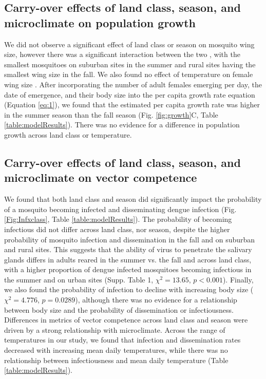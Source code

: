 \documentclass[12pt]{article}
\begin{document}
\subsection{Carry-over effects of land class, season, and microclimate on population growth}

We did not observe a significant effect of land class or season on mosquito wing size, however there was a significant interaction between the two , with the smallest mosquitoes on suburban sites in the summer and rural sites having the smallest wing size in the fall. We also found no effect of temperature on female wing size . After incorporating the number of adult females emerging per day, the date of emergence, and their body size into the per capita growth rate equation (Equation \ref{eq:1}), we found that the estimated per capita growth rate was higher in the summer season than the fall season (Fig. \ref{fig:growth}C, Table \ref{table:modelResults}). There was no evidence for a difference in population growth across land class or temperature.

\subsection{Carry-over effects of land class, season, and microclimate on vector competence}

We found that both land class and season did significantly impact the probability of a mosquito becoming infected and disseminating dengue infection (Fig. \ref{Fig:Infxclass}, Table \ref{table:modelResults}). The probability of becoming infectious did not differ across land class, nor season, despite the higher probability of mosquito infection and dissemination in the fall and on suburban and rural sites. This suggests that the ability of virus to penetrate the salivary glands differs in adults reared in the summer vs. the fall and across land class, with a higher proportion of dengue infected mosquitoes becoming infectious in the summer and on urban sites (Supp. Table 1, $\chi^2=13.65$, $p<0.001$). Finally, we also found the probability of infection to decline with increasing body size ($\chi^2=4.776$, $p=0.0289$), although there was no evidence for a relationship between body size and the probability of dissemination or infectiousness. Differences in metrics of vector competence across land class and season were driven by a strong relationship with microclimate. Across the range of temperatures in our study, we found that infection and dissemination rates decreased with increasing mean daily temperatures, while there was no relationship between infectiousness and mean daily temperature (Table \ref{table:modelResults}).
\end{document}
